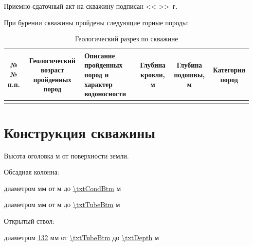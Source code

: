 	Приемно-сдаточный акт на скважину подписан << \underline{\hspace{0.7cm}} >> \underline{\hspace{3cm}} \txtYear \,г.	
	
	\pagebreak
	
	При бурении скважины пройдены следующие горные породы:

	\begin{table}[!h]\footnotesize
	\centering
	\caption{Геологический разрез по скважине}
	\begin{tabulary}{\textwidth}{|C|C|L|C|C|C|}
	\hline 
	№№ п.п. & Геологический возраст пройденных пород & Описание пройденных пород и характер водоносности & Глубина кровли, м & Глубина подошвы, м & Категория пород \\ 
	\hline 
	\txtGeological  %
	\end{tabulary} 
	\end{table}

	\section{Конструкция скважины}

	Высота оголовка	\underline{\txtOgolovok} м	от поверхности земли. 
	
	\bigskip

	Обсадная колонна:

	диаметром \underline{\txtCondDiam} мм от \underline{\txtOgolovok} м до \underline{\num{\txtCondBtm}}  м  		
	
	диаметром \underline{\txtTubeDiam} мм от \underline{\txtOgolovok} м до \underline{\num{\txtTubeBtm}} м
	
	\bigskip

	Открытый ствол:

	 диаметром \underline{132} мм от \underline{\num{\txtTubeBtm}} до \underline{\num{\txtDepth}} м 
    
